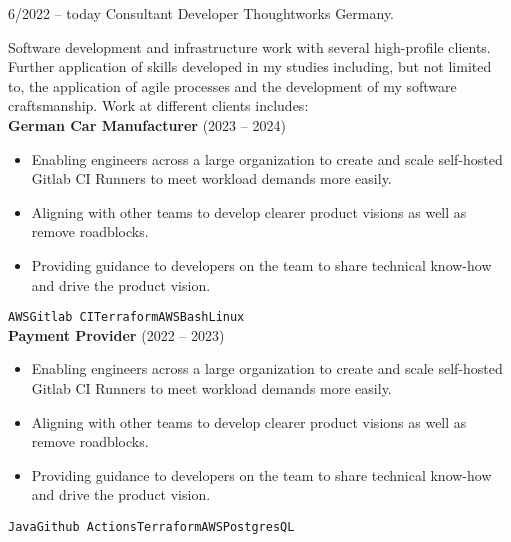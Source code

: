 \documentclass[9pt]{developercv} %
\begin{document}
\begin{entrylist}
	\entry
		{6/2022 -- today}
		{Consultant Developer}
		{Thoughtworks Germany.}
		{Software development and infrastructure work with several high-profile clients. Further application of skills developed in my studies including, but not limited to, the application of agile processes and the development of my software craftsmanship. Work at different clients includes:\\

        \textbf{German Car Manufacturer} {\footnotesize(2023 -- 2024)}
        \begin{itemize}
            \item Enabling engineers across a large organization to create and scale self-hosted Gitlab CI Runners to meet workload demands more easily.
            \item Aligning with other teams to develop clearer product visions as well as remove roadblocks.
            \item Providing guidance to developers on the team to share technical know-how and drive the product vision.
        \end{itemize}
  \texttt{AWS}\slashsep\texttt{Gitlab CI}\slashsep\texttt{Terraform}\slashsep\texttt{AWS}\slashsep\texttt{Bash}\slashsep\texttt{Linux}\\
  
        \textbf{Payment Provider} {\footnotesize(2022 -- 2023)}
        \begin{itemize}
            \item Enabling engineers across a large organization to create and scale self-hosted Gitlab CI Runners to meet workload demands more easily.
            \item Aligning with other teams to develop clearer product visions as well as remove roadblocks.
            \item Providing guidance to developers on the team to share technical know-how and drive the product vision.
        \end{itemize}
  \texttt{Java}\slashsep\texttt{Github Actions}\slashsep\texttt{Terraform}\slashsep\texttt{AWS}\slashsep\texttt{PostgresQL}
  
}
\end{entrylist}
\end{document}
